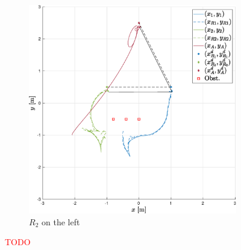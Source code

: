 \documentclass{ifacconf}
\begin{document}
\begin{figure}[h!]
\begin{subfigure}[b]{0.31\columnwidth}
        \includegraphics[width=\linewidth]{images/experiment/static_obstacles/1st_scenario_exp_obs_swap.eps}
        \caption{$R_2$ on the left}
    \end{subfigure}
    \vspace{-0.2cm}
    \caption{\textcolor{red}{TODO}}
\end{figure}
\end{document}
